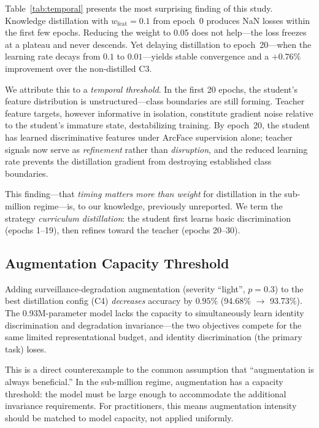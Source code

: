 \documentclass[journal,10pt]{IEEEtran}
\begin{document}
Table~\ref{tab:temporal} presents the most surprising finding of this study. Knowledge distillation with $w_{\mathrm{feat}}{=}0.1$ from epoch~0 produces NaN losses within the first few epochs. Reducing the weight to $0.05$ does not help---the loss freezes at a plateau and never descends. Yet delaying distillation to epoch~20---when the learning rate decays from $0.1$ to $0.01$---yields stable convergence and a $+0.76\%$ improvement over the non-distilled C3.

We attribute this to a \emph{temporal threshold}. In the first 20 epochs, the student's feature distribution is unstructured---class boundaries are still forming. Teacher feature targets, however informative in isolation, constitute gradient noise relative to the student's immature state, destabilizing training. By epoch~20, the student has learned discriminative features under ArcFace supervision alone; teacher signals now serve as \emph{refinement} rather than \emph{disruption}, and the reduced learning rate prevents the distillation gradient from destroying established class boundaries.

This finding---that \emph{timing matters more than weight} for distillation in the sub-million regime---is, to our knowledge, previously unreported. We term the strategy \emph{curriculum distillation}: the student first learns basic discrimination (epochs 1--19), then refines toward the teacher (epochs 20--30).

\subsection{Augmentation Capacity Threshold}
\label{sec:augment}

Adding surveillance-degradation augmentation (severity ``light'', $p{=}0.3$) to the best distillation config (C4) \emph{decreases} accuracy by $0.95\%$ (94.68\% $\to$ 93.73\%). The 0.93M-parameter model lacks the capacity to simultaneously learn identity discrimination and degradation invariance---the two objectives compete for the same limited representational budget, and identity discrimination (the primary task) loses.

This is a direct counterexample to the common assumption that ``augmentation is always beneficial.'' In the sub-million regime, augmentation has a capacity threshold: the model must be large enough to accommodate the additional invariance requirements. For practitioners, this means augmentation intensity should be matched to model capacity, not applied uniformly.
\end{document}

